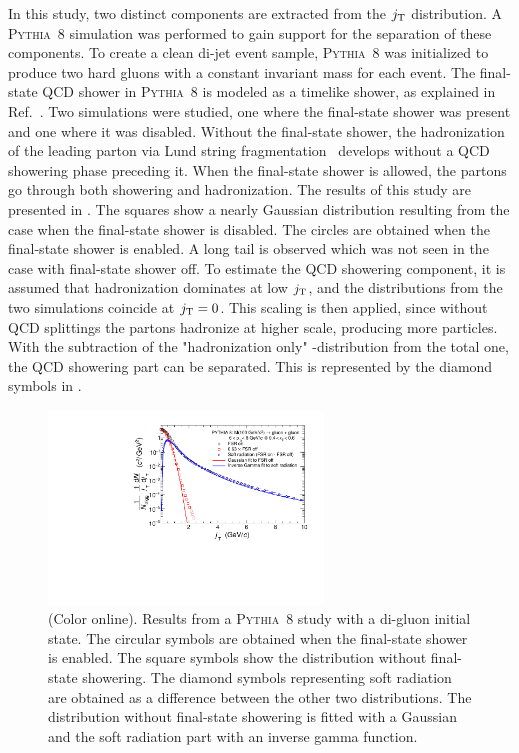 In this study, two distinct components are extracted from the $j_{\rm T}$ distribution. A \textsc{Pythia}~8 simulation was performed to gain support for the separation of these components. To create a clean di-jet event sample, \textsc{Pythia}~8 was initialized to produce two hard gluons with a constant invariant mass for each event. The final-state QCD shower in \textsc{Pythia}~8 is modeled as a timelike shower, as explained in Ref.~\cite{newPythiaShower}. Two simulations were studied, one where the final-state shower was present and one where it was disabled. Without the final-state shower, the hadronization of the leading parton via Lund string fragmentation~\cite{lundString} develops without a QCD showering phase preceding it. When the final-state shower is allowed, the partons go through both showering and hadronization. The results of this study are presented in . The squares show a nearly Gaussian distribution resulting from the case when the final-state shower is disabled. The circles are obtained when the final-state shower is enabled. A long tail is observed which was not seen in the case with final-state shower off. To estimate the QCD showering component, it is assumed that hadronization dominates at low $j_{\rm T}$, and the distributions from the two simulations coincide at $j_{\rm T} = 0$. This scaling is then applied, since without QCD splittings the partons hadronize at higher scale, producing more particles. With the subtraction of the "hadronization only" -distribution from the total one, the QCD showering part can be separated. This is represented by the diamond symbols in .
  
  \begin{figure}
    \begin{center}
      \includegraphics[width = 0.65\textwidth]{figures/pythia_fitComponents_updatedDetails_pTt=6v0-8v0_xe=0v4-0v6}
    \end{center}
    \caption{(Color online). Results from a \textsc{Pythia}~8 study with a di-gluon initial state. The circular symbols are obtained when the final-state shower is enabled. The square symbols show the distribution without final-state showering. The diamond symbols representing soft radiation are obtained as a difference between the other two distributions. The distribution without final-state showering is fitted with a Gaussian and the soft radiation part with an inverse gamma function.}
    \label{fig:componentsFromResonance}
  \end{figure}  
  
